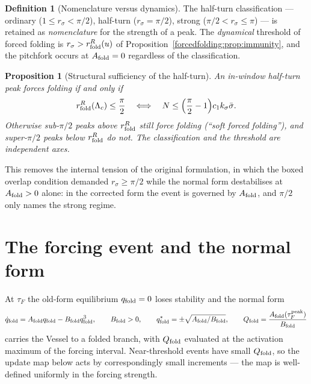 \documentclass[11pt,a4paper,oneside]{book}
\newcommand{\Lc}{\Lambda_c}
\newcommand{\Qf}{Q_{\rm fold}}
\newcommand{\qf}{q_{\rm fold}}
\newcommand{\Af}{A_{\rm fold}}
\newcommand{\Bf}{B_{\rm fold}}
\newcommand{\rs}{r_\sigma}
\newcommand{\rR}{r^{R}_{\rm fold}}
\theoremstyle{plain}
\newtheorem{proposition}{Proposition}[chapter]
\theoremstyle{definition}
\newtheorem{definition}{Definition}[chapter]
\theoremstyle{remark}
\begin{document}
\begin{definition}[Nomenclature versus dynamics]\label{forcedfolding:def:regimes}
The half-turn classification --- ordinary ($1\le\rs<\pi/2$), half-turn ($\rs=\pi/2$), strong
($\pi/2<\rs\le\pi$) --- is retained as \emph{nomenclature} for the strength of a peak. The
\emph{dynamical} threshold of forced folding is $\rs>\rR(u)$ of Proposition~\ref{forcedfolding:prop:immunity}, and the
pitchfork occurs at $\Af=0$ regardless of the classification.
\end{definition}

\begin{proposition}[Structural sufficiency of the half-turn]\label{forcedfolding:prop:halfturn}
An in-window half-turn peak forces folding if and only if
\begin{equation}
\rR(\Lc)\le\frac{\pi}{2}
\quad\Longleftrightarrow\quad
N\le\Bigl(\frac{\pi}{2}-1\Bigr)c_1k_\sigma\bar\sigma .
\end{equation}
Otherwise sub-$\pi/2$ peaks above $\rR$ still force folding (``soft forced folding''), and
super-$\pi/2$ peaks below $\rR$ do not. The classification and the threshold are independent axes.
\end{proposition}

This removes the internal tension of the original formulation, in which the boxed overlap condition
demanded $\rs\ge\pi/2$ while the normal form destabilises at $\Af>0$ alone: in the corrected form the
event is governed by $\Af$, and $\pi/2$ only names the strong regime.

\section{The forcing event and the normal form}\label{forcedfolding:sec:event}

At $\tau_F$ the old-form equilibrium $\qf=0$ loses stability and the normal form
\begin{equation}
\dot\qf=\Af\qf-\Bf\qf^3,\qquad \Bf>0,
\qquad
\qf^\ast=\pm\sqrt{\Af/\Bf},
\qquad
\Qf=\frac{\Af(\tau_F^{\rm peak})}{\Bf}
\end{equation}
carries the Vessel to a folded branch, with $\Qf$ evaluated at the activation maximum of the forcing
interval. Near-threshold events have small $\Qf$, so the update map below acts by correspondingly small
increments --- the map is well-defined uniformly in the forcing strength.
\end{document}
